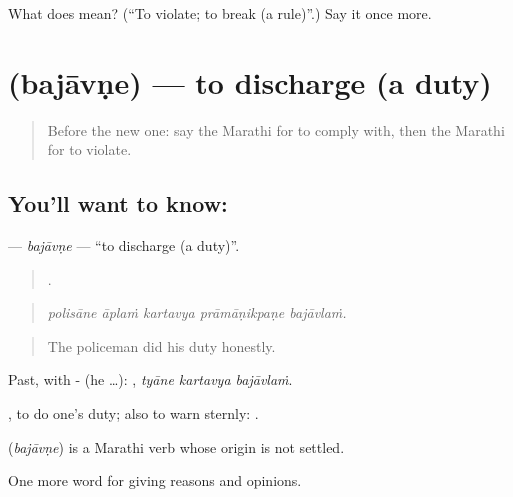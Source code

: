 \begin{tcolorbox}[breakable,colback=teal!4,colframe=teal!35!black,title={Before you move on}]
What does   mean? (\textquotedblleft{}To violate; to break (a rule)\textquotedblright{}.) Say it once more.
\end{tcolorbox}
\section[\texorpdfstring{\mr{बजावणे} (bajāvṇe)}{बजावणे (bajāvṇe)}]{ (bajāvṇe) — to discharge (a duty)}

\label{lesson:MR-C368-bajavne}



\begin{quote}
Before the new one: say the Marathi for to comply with, then the Marathi for to violate.
\end{quote}

\subsection*{You'll want to know: }
\textbf{} — \emph{bajāvṇe} — \textquotedblleft{}to discharge (a duty)\textquotedblright{}.

\begin{quote}
    .
\end{quote}

\begin{quote}
\emph{polisāne āplaṁ kartavya prāmāṇikpaṇe bajāvlaṁ.}
\end{quote}

\begin{quote}
The policeman did his duty honestly.
\end{quote}

Past, with - (he …):   , \emph{tyāne kartavya bajāvlaṁ}.

 , to do one's duty; also to warn sternly:  .

\begin{cousinweb}
\textbf{} (\emph{bajāvṇe}) is a Marathi verb whose origin is not settled.
\end{cousinweb}

\begin{grammarlens}[title={What you've built}]
One more word for giving reasons and opinions.
\end{grammarlens}

